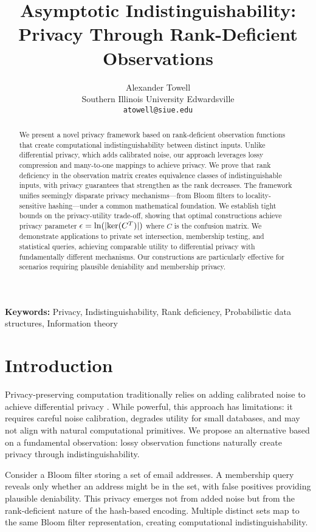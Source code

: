 \documentclass[11pt]{article}
\title{Asymptotic Indistinguishability:\\Privacy Through Rank-Deficient Observations}
\author{Alexander Towell\\
Southern Illinois University Edwardsville\\
\texttt{atowell@siue.edu}}
\begin{document}
\maketitle

\begin{abstract}
We present a novel privacy framework based on rank-deficient observation functions that create computational indistinguishability between distinct inputs. Unlike differential privacy, which adds calibrated noise, our approach leverages lossy compression and many-to-one mappings to achieve privacy. We prove that rank deficiency in the observation matrix creates equivalence classes of indistinguishable inputs, with privacy guarantees that strengthen as the rank decreases. The framework unifies seemingly disparate privacy mechanisms—from Bloom filters to locality-sensitive hashing—under a common mathematical foundation. We establish tight bounds on the privacy-utility trade-off, showing that optimal constructions achieve privacy parameter $\epsilon = \ln(|\text{ker}(C^T)|)$ where $C$ is the confusion matrix. We demonstrate applications to private set intersection, membership testing, and statistical queries, achieving comparable utility to differential privacy with fundamentally different mechanisms. Our constructions are particularly effective for scenarios requiring plausible deniability and membership privacy.
\end{abstract}

\textbf{Keywords:} Privacy, Indistinguishability, Rank deficiency, Probabilistic data structures, Information theory

\section{Introduction}

Privacy-preserving computation traditionally relies on adding calibrated noise to achieve differential privacy \cite{dwork2006}. While powerful, this approach has limitations: it requires careful noise calibration, degrades utility for small databases, and may not align with natural computational primitives. We propose an alternative based on a fundamental observation: lossy observation functions naturally create privacy through indistinguishability.

Consider a Bloom filter storing a set of email addresses. A membership query reveals only whether an address might be in the set, with false positives providing plausible deniability. This privacy emerges not from added noise but from the rank-deficient nature of the hash-based encoding. Multiple distinct sets map to the same Bloom filter representation, creating computational indistinguishability.
\end{document}
